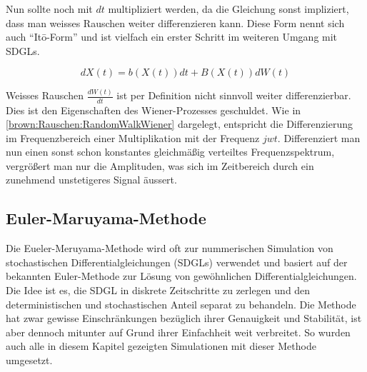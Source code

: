 Nun sollte noch mit $ dt $  multipliziert werden, da die Gleichung sonst impliziert, dass man weisses Rauschen weiter differenzieren kann. Diese Form nennt sich auch ``Itō-Form'' und ist vielfach ein erster Schritt im weiteren Umgang mit SDGLs.

\begin{equation}
	dX(t) = b(X(t)) dt + B(X(t)) dW(t)
\end{equation}

Weisses Rauschen $ \frac{dW(t)}{dt} $ ist per Definition nicht sinnvoll weiter differenzierbar. Dies ist den Eigenschaften des Wiener-Prozesses geschuldet. Wie in \ref{brown:Rauschen:RandomWalkWiener} dargelegt, entspricht die Differenzierung im Frequenzbereich einer Multiplikation mit der Frequenz $ jwt $. Differenziert man nun einen sonst schon konstantes gleichmäßig verteiltes Frequenzspektrum, vergrößert man nur die Amplituden, was sich im Zeitbereich durch ein zunehmend unstetigeres Signal äussert.



\subsection{Euler-Maruyama-Methode\label{brown:Simulation}}

Die Eueler-Meruyama-Methode wird oft zur nummerischen Simulation von stochastischen Differentialgleichungen (SDGLs) verwendet und basiert auf der bekannten Euler-Methode zur Lösung von gewöhnlichen Differentialgleichungen. Die Idee ist es, die SDGL in diskrete Zeitschritte zu zerlegen und den deterministischen und stochastischen Anteil separat zu behandeln. Die Methode hat zwar gewisse Einschränkungen bezüglich ihrer Genauigkeit und Stabilität, ist aber dennoch mitunter auf Grund ihrer Einfachheit weit verbreitet. So wurden auch alle in diesem Kapitel gezeigten Simulationen mit dieser Methode umgesetzt. 





